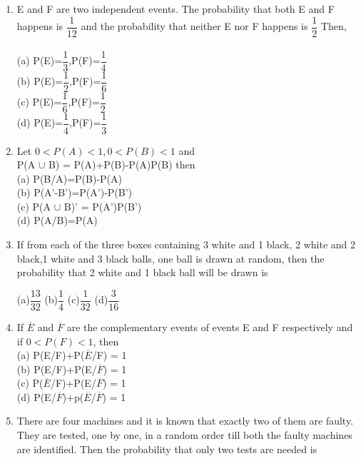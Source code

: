 \documentclass[journal,12pt,twocolumn]{IEEEtran}
\begin{document}
\begin{enumerate}[label=\arabic*]
	\item E and F are two independent events. The probability that both E and F happens is $\dfrac{1}{12}$ and the probability that neither E nor F happens is $\dfrac{1}{2}$ Then,\\
	\\
	(a) P(E)=$\dfrac{1}{3}$,P(F)=$\dfrac{1}{4}$\\
	(b) P(E)=$\dfrac{1}{2}$,P(F)=$\dfrac{1}{6}$\\
	(c) P(E)=$\dfrac{1}{6}$,P(F)=$\dfrac{1}{2}$\\
	(d) P(E)=$\dfrac{1}{4}$,P(F)=$\dfrac{1}{3}$\\
	\item Let $0<P(A)<1, 0<P(B)<1$ and\\
	P(A $\cup$ B) = P(A)+P(B)-P(A)P(B) then\\
	(a) P(B/A)=P(B)-P(A)\\
	(b) P(A'-B')=P(A')-P(B')\\
	(c) P(A $\cup$ B)' = P(A')P(B')\\
	(d) P(A/B)=P(A)\\
	\item If from each of the three boxes containing 3 white and 1 black, 2 white and 2 black,1 white and 3 black balls, one ball is drawn at random, then the probability that 2 white and 1 black ball will be drawn is
	\begin{multicols}{4}
	(a)$\dfrac{13}{32}$
	(b)$\dfrac{1}{4}$
	(c)$\dfrac{1}{32}$
	(d)$\dfrac{3}{16}$
	\end{multicols}
	\item If $\overline{E}$ and $\overline{F}$ are the complementary events of events E and F respectively and if $0<P(F)<1$, then\\
	(a) P(E/F)+P($\overline{E}$/F) = 1\\
	(b) P(E/F)+P(E/$\overline{F}$) = 1\\
	(c) P($\overline{E}$/F)+P(E/$\overline{F}$) = 1\\
	(d) P(E/$\overline{F}$)+p($\overline{E}$/$\overline{F}$) = 1\\
	\item There are four machines and it is known that exactly two of them are faulty. They are tested, one by one, in a random order till both the faulty machines are identified. Then the probability that only two tests are needed is 
	\begin{itemize}
	\begin{multicols}{4}
	\item[(a)]$\dfrac{1}{3}$   \item[(b)]$\dfrac{1}{6}$   \item[(c)]$\dfrac{1}{2}$  \item[(d)]$\dfrac{1}{4}$

\end{multicols}
\end{itemize}
\end{enumerate}
\end{document}
